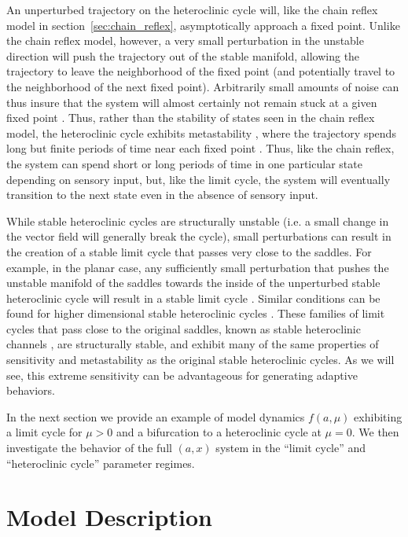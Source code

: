 An unperturbed trajectory on the
heteroclinic cycle will, like the chain reflex model in
section~\ref{sec:chain_reflex}, asymptotically approach a fixed point.
Unlike the chain reflex model, however, a very small perturbation in the
unstable direction will push the trajectory out of the stable manifold,
allowing the trajectory to leave the neighborhood of the fixed point (and
potentially travel to the neighborhood of the next fixed point).  Arbitrarily
small amounts of noise can thus insure that the system will almost certainly
not remain stuck at a given fixed point \citep{stone_random_1990}.  Thus,
rather than the stability of states seen in the chain reflex model, the
heteroclinic cycle exhibits metastability \citep{afraimovich_nonlinear_2011},
where the trajectory spends long but finite periods of time near each fixed
point \citep{bakhtin_noisy_2011}.
Thus, like the chain reflex, the system can spend short or long periods of time
in one particular state depending on sensory input, but, like the limit cycle,
the system will eventually transition to the next state even in the absence of
sensory input.

While stable heteroclinic cycles are structurally unstable (i.e. a small
change in the vector field will generally break the cycle), small
perturbations can result in the creation of a stable limit cycle that
passes very close to the saddles.  For example, in the planar case, any
sufficiently small perturbation that pushes the unstable manifold of the
saddles towards the inside of the unperturbed stable heteroclinic cycle will
result in a stable limit cycle \citep{reyn_generation_1980}.  Similar
conditions can be found for higher dimensional stable heteroclinic cycles
\citep{afraimovich_heteroclinic_2003}.  These families of limit cycles
that pass close to the original saddles, known as stable heteroclinic
channels \citep{rabinovich_transient_2008}, are structurally stable, and
exhibit many of the same properties of sensitivity and metastability as the
original stable heteroclinic cycles.  As we will see, this extreme sensitivity
can be advantageous for generating adaptive behaviors.

In the next section we provide an example of model dynamics $f(a,\mu)$
exhibiting a limit cycle for $\mu>0$ and a bifurcation to a heteroclinic
cycle at $\mu=0$.  We then investigate the behavior of the full $(a,x)$ system
in the ``limit cycle'' and ``heteroclinic cycle'' parameter regimes.

\section{Model Description}
\label{sec:model_description}

